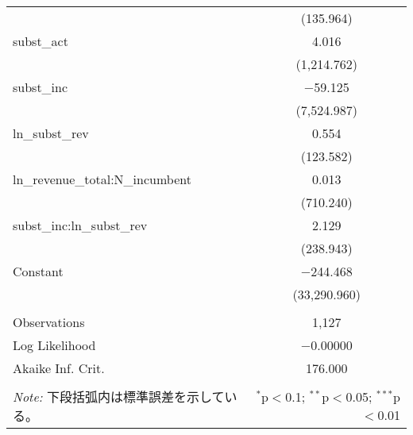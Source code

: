 \documentclass[a4j,10.5pt]{jarticle}
\begin{document}
\begin{table}[!htbp]
{\begin{tabular}{@{\extracolsep{5pt}}lc}
          & (135.964) \\ 
         subst\_act & 4.016 \\ 
          & (1,214.762) \\ 
         subst\_inc & $-$59.125 \\ 
          & (7,524.987) \\ 
         ln\_subst\_rev & 0.554 \\ 
          & (123.582) \\ 
         ln\_revenue\_total:N\_incumbent & 0.013 \\ 
          & (710.240) \\ 
         subst\_inc:ln\_subst\_rev & 2.129 \\ 
          & (238.943) \\ 
         Constant & $-$244.468 \\ 
          & (33,290.960) \\ 
        \hline \\[-1.8ex] 
        Observations & 1,127 \\ 
        Log Likelihood & $-$0.00000 \\ 
        Akaike Inf. Crit. & 176.000 \\ 
        \hline 
        \hline \\[-1.8ex] 
        \textit{Note:} 下段括弧内は標準誤差を示している。 & \multicolumn{1}{r}{$^{*}$p$<$0.1; $^{**}$p$<$0.05; $^{***}$p$<$0.01} \\ 
    \end{tabular} 
    }
\end{table} 
\end{document}

